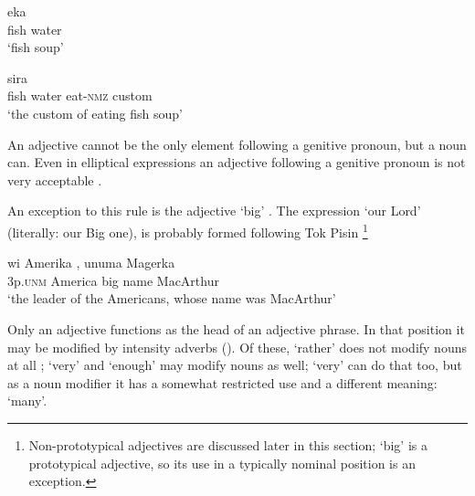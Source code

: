 \ea%
\label{ex:3:x15}
\gll {} eka \\
fish water\\
\glt`fish soup'
\z

\ea%
\label{ex:3:x16}
\gll {\ob}{\ob}   sira \\
\hspaceThis{[[}fish water eat-\textsc{nmz} custom\\
\glt`the custom of eating fish soup'
\z

An adjective cannot be the only element following a genitive pronoun, but a noun can. Even in elliptical expressions an adjective following a genitive pronoun is not very acceptable . 

\z

An exception to this rule is the adjective  `big' . The expression  `our Lord' (literally: our Big one), is probably formed following Tok Pisin \footnote{Non-prototypical adjectives are discussed later in this section; `big' is a prototypical adjective, so its use in a typically nominal position is an exception.} 

\ea%
\label{ex:3:x105}
\gll wi Amerika , unuma Magerka \\
3p.\textsc{unm} America big name MacArthur\\
\glt`the leader of the Americans, whose name was MacArthur'
\z

Only an adjective functions as the head of an adjective phrase. In that position it may be modified by intensity adverbs (). Of these,  `rather' does not modify nouns at all ;  `very' and  `enough' may modify nouns as well;  `very' can do that too, but as a noun modifier it has a somewhat restricted use and a different meaning: `many'.

